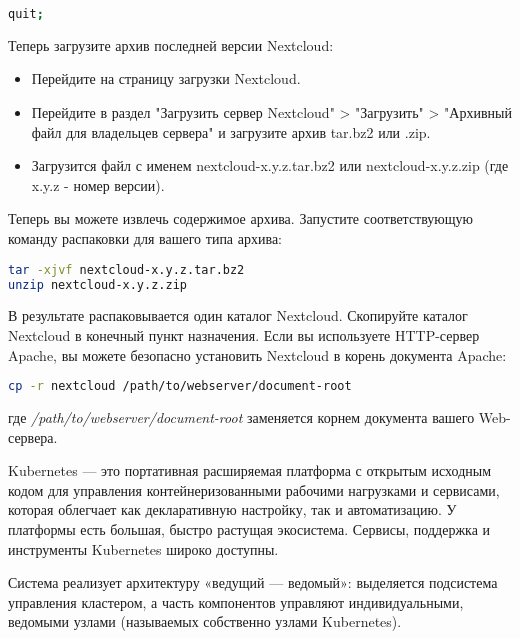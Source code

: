 \begin{lstlisting}[language=bash]
quit;
\end{lstlisting}

Теперь загрузите архив последней версии Nextcloud: 
\begin{itemize}
    \item Перейдите на страницу загрузки Nextcloud. 
    \item Перейдите в раздел "Загрузить сервер Nextcloud" > "Загрузить" > "Архивный файл для владельцев сервера" и загрузите архив tar.bz2 или .zip. 
    \item Загрузится файл с именем nextcloud-x.y.z.tar.bz2 или nextcloud-x.y.z.zip (где x.y.z - номер версии). 
\end{itemize}

Теперь вы можете извлечь содержимое архива. Запустите соответствующую команду распаковки для вашего типа архива:

\begin{lstlisting}[language=bash]
tar -xjvf nextcloud-x.y.z.tar.bz2
unzip nextcloud-x.y.z.zip
\end{lstlisting}

В результате распаковывается один каталог Nextcloud. Скопируйте каталог Nextcloud в конечный пункт назначения. Если вы используете HTTP-сервер Apache, вы можете безопасно установить Nextcloud в корень документа Apache:

\begin{lstlisting}[language=bash]
cp -r nextcloud /path/to/webserver/document-root
\end{lstlisting}

где \textit{/path/to/webserver/document-root} заменяется корнем документа вашего Web-сервера.



Kubernetes — это портативная расширяемая платформа с открытым исходным кодом для управления контейнеризованными рабочими нагрузками и сервисами, которая облегчает как декларативную настройку, так и автоматизацию. У платформы есть большая, быстро растущая экосистема. Сервисы, поддержка и инструменты Kubernetes широко доступны. \cite{Kubernetes}

Система реализует архитектуру «ведущий — ведомый»: выделяется подсистема управления кластером, а часть компонентов управляют индивидуальными, ведомыми узлами (называемых собственно узлами Kubernetes)\cite{WhatisKubernetes}.

